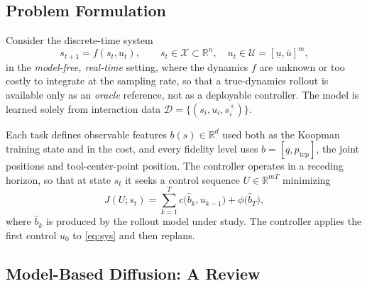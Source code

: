 \documentclass[letterpaper,10pt,conference]{ieeeconf}
\begin{document}
\subsection{Problem Formulation}\label{subsec:problem}

Consider the discrete-time system
\begin{equation}
s_{t+1} = f(s_t, u_t), \qquad
s_t \in \mathcal{X} \subset \mathbb{R}^{n},\quad
u_t \in \mathcal{U} = [\underline{u}, \bar{u}]^{m},
\label{eq:sys}
\end{equation}
in the \emph{model-free, real-time} setting, where the dynamics $f$ are unknown or too costly to integrate at the sampling rate, so that a true-dynamics rollout is available only as an \emph{oracle} reference, not as a deployable controller.
The model is learned solely from interaction data $\mathcal{D} = \{(s_i, u_i, s_i^{+})\}$.

Each task defines observable features $b(s) \in \mathbb{R}^{d}$ used both as the Koopman training state and in the cost, and every fidelity level uses $b = [q, p_{\mathrm{tcp}}]$, the joint positions and tool-center-point position.
The controller operates in a receding horizon, so that at state $s_t$ it seeks a control sequence $U \in \mathbb{R}^{mT}$ minimizing
\begin{equation}
J(U; s_t) = \sum_{k=1}^{T} c\big(\hat{b}_k, u_{k-1}\big)
+ \phi\big(\hat{b}_T\big),
\label{eq:cost}
\end{equation}
where $\hat b_k$ is produced by the rollout model under study. The controller applies the first control $u_0$ to \eqref{eq:sys} and then replans.

\subsection{Model-Based Diffusion: A Review}\label{subsec:mbd}
\end{document}
